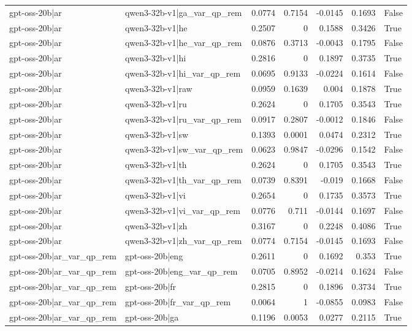 \begin{table}
\begin{tabular}{l l r r r r l}
gpt-oss-20b|ar & qwen3-32b-v1|ga_var_qp_rem & 0.0774 & 0.7154 & -0.0145 & 0.1693 & False \\
gpt-oss-20b|ar & qwen3-32b-v1|he & 0.2507 & 0 & 0.1588 & 0.3426 & True \\
gpt-oss-20b|ar & qwen3-32b-v1|he_var_qp_rem & 0.0876 & 0.3713 & -0.0043 & 0.1795 & False \\
gpt-oss-20b|ar & qwen3-32b-v1|hi & 0.2816 & 0 & 0.1897 & 0.3735 & True \\
gpt-oss-20b|ar & qwen3-32b-v1|hi_var_qp_rem & 0.0695 & 0.9133 & -0.0224 & 0.1614 & False \\
gpt-oss-20b|ar & qwen3-32b-v1|raw & 0.0959 & 0.1639 & 0.004 & 0.1878 & True \\
gpt-oss-20b|ar & qwen3-32b-v1|ru & 0.2624 & 0 & 0.1705 & 0.3543 & True \\
gpt-oss-20b|ar & qwen3-32b-v1|ru_var_qp_rem & 0.0917 & 0.2807 & -0.0012 & 0.1846 & False \\
gpt-oss-20b|ar & qwen3-32b-v1|sw & 0.1393 & 0.0001 & 0.0474 & 0.2312 & True \\
gpt-oss-20b|ar & qwen3-32b-v1|sw_var_qp_rem & 0.0623 & 0.9847 & -0.0296 & 0.1542 & False \\
gpt-oss-20b|ar & qwen3-32b-v1|th & 0.2624 & 0 & 0.1705 & 0.3543 & True \\
gpt-oss-20b|ar & qwen3-32b-v1|th_var_qp_rem & 0.0739 & 0.8391 & -0.019 & 0.1668 & False \\
gpt-oss-20b|ar & qwen3-32b-v1|vi & 0.2654 & 0 & 0.1735 & 0.3573 & True \\
gpt-oss-20b|ar & qwen3-32b-v1|vi_var_qp_rem & 0.0776 & 0.711 & -0.0144 & 0.1697 & False \\
gpt-oss-20b|ar & qwen3-32b-v1|zh & 0.3167 & 0 & 0.2248 & 0.4086 & True \\
gpt-oss-20b|ar & qwen3-32b-v1|zh_var_qp_rem & 0.0774 & 0.7154 & -0.0145 & 0.1693 & False \\
gpt-oss-20b|ar_var_qp_rem & gpt-oss-20b|eng & 0.2611 & 0 & 0.1692 & 0.353 & True \\
gpt-oss-20b|ar_var_qp_rem & gpt-oss-20b|eng_var_qp_rem & 0.0705 & 0.8952 & -0.0214 & 0.1624 & False \\
gpt-oss-20b|ar_var_qp_rem & gpt-oss-20b|fr & 0.2815 & 0 & 0.1896 & 0.3734 & True \\
gpt-oss-20b|ar_var_qp_rem & gpt-oss-20b|fr_var_qp_rem & 0.0064 & 1 & -0.0855 & 0.0983 & False \\
gpt-oss-20b|ar_var_qp_rem & gpt-oss-20b|ga & 0.1196 & 0.0053 & 0.0277 & 0.2115 & True \\

\end{tabular}
\end{table}
